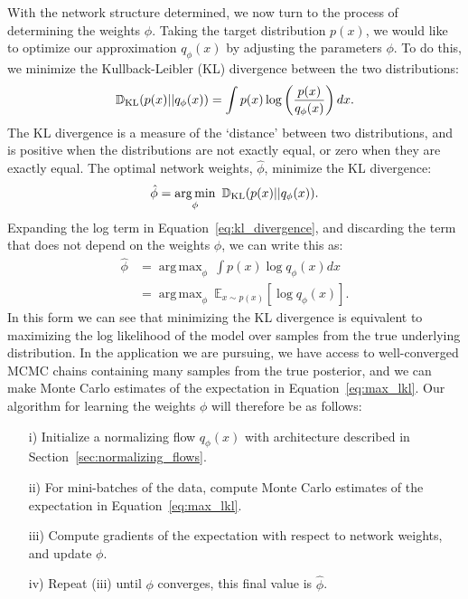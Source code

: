\documentclass[fleqn,usenatbib]{mnras}
\DeclareMathOperator*{\argmin}{arg\,min}
\DeclareMathOperator*{\argmax}{arg\,max}
\begin{document}
With the network structure determined, we now turn to the process of determining the weights $\phi$. Taking the target distribution $p(x)$, we would like to optimize our approximation $q_\phi(x)$ by adjusting the parameters $\phi$. To do this, we minimize the Kullback-Leibler (KL) divergence between the two distributions:
\begin{equation}
\label{eq:kl_divergence}
    \mathbb{D}_{\rm KL}(p(x) || q_\phi(x)) = \int p(x) \log\left(\frac{p(x)}{q_\phi(x)}\right)dx.
\end{equation}
The KL divergence is a measure of the `distance' between two distributions, and is positive when the distributions are not exactly equal, or zero when they are exactly equal. The optimal network weights, $\hat \phi$, minimize the KL divergence:
\begin{equation}
    \hat \phi = \argmin_\phi~\mathbb D_{\rm KL}(p(x) || q_\phi(x)).
\end{equation}
Expanding the log term in Equation~\ref{eq:kl_divergence}, and discarding the term that does not depend on the weights $\phi$, we can write this as:
\begin{equation}
\label{eq:max_lkl}
\begin{aligned}
    \hat \phi &= \argmax_\phi~\int p(x) \log q_\phi(x) dx \\
              &= \argmax_\phi~\mathbb E_{x\sim p(x)}[\log q_\phi(x)].
\end{aligned}
\end{equation}
In this form we can see that minimizing the KL divergence is equivalent to maximizing the log likelihood of the model over samples from the true underlying distribution. In the application we are pursuing, we have access to well-converged MCMC chains containing many samples from the true posterior, and we can make Monte Carlo estimates of the expectation in Equation~\ref{eq:max_lkl}. Our algorithm for learning the weights $\phi$ will therefore be as follows:
\begin{itemize}
    \item[i)] Initialize a normalizing flow $q_\phi(x)$ with architecture described in Section~\ref{sec:normalizing_flows}.
    \item[ii)] For mini-batches of the data, compute Monte Carlo estimates of the expectation in Equation~\ref{eq:max_lkl}.
    \item[iii)] Compute gradients of the expectation with respect to network weights, and update $\phi$.
    \item[iv)] Repeat (iii) until $\phi$ converges, this final value is $\hat \phi$.
\end{itemize}
\end{document}
